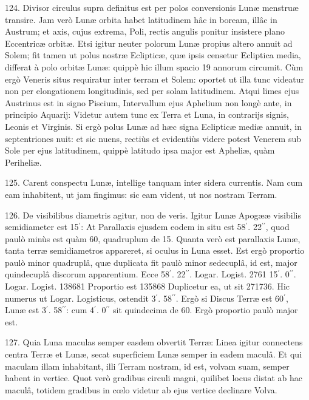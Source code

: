 \documentclass[a4paper, 11pt, oneside, polutonikogreek, german]{article}
\begin{document}
124. Divisor circulus supra definitus est per polos conversionis Lunæ menstruæ transire. Jam verò Lunæ orbita habet latitudinem hâc in boream, illâc in Austrum; et axis, cujus extrema, Poli, rectis angulis ponitur insistere plano Eccentricæ orbitæ. Etsi igitur neuter polorum Lunæ propius altero annuit ad Solem; fit tamen ut polus nostræ Eclipticæ, quæ ipsis censetur Ecliptica media, differat à polo orbitæ Lunæ: quippè hic illum spacio 19 annorum circumit. Cùm ergò Veneris situs requiratur inter terram et Solem: oportet ut illa tunc videatur non per elongationem longitudinis, sed per solam latitudinem. Atqui limes ejus Austrinus est in signo Piscium, Intervallum ejus Aphelium non longè ante, in principio Aquarij: Videtur autem tunc ex Terra et Luna, in contrarijs signis, Leonis et Virginis. Si ergò polus Lunæ ad hæc signa Eclipticæ mediæ annuit, in septentriones nuit: et sic nuens, rectiùs et evidentiùs videre potest Venerem sub Sole per ejus latitudinem, quippè latitudo ipsa major est Apheliæ, quàm Periheliæ.

125. Carent conspectu Lunæ, intellige tanquam inter sidera currentis. Nam cum eam inhabitent, ut jam fingimus: sic eam vident, ut nos nostram Terram.

126. De visibilibus diametris agitur, non de veris. Igitur Lunæ Apogææ visibilis semidiameter est 15$^{\prime}$: At Parallaxis ejusdem eodem in situ est 58$^{\prime}$. 22$^{\prime\prime}$, quod paulò minùs est quàm 60, quadruplum de 15. Quanta verò est parallaxis Lunæ, tanta terræ semidiametros appareret, si oculus in Luna esset. Est ergò proportio paulò minor quadruplâ, quæ duplicata fit paulò minor sedecuplâ, id est, major quindecuplâ discorum apparentium. Ecce\hspace*{5mm}
58$^{\prime}$. 22$^{\prime\prime}$. Logar. Logist. 2761\hspace*{5mm}
15$^{\prime}$. 0$^{\prime\prime}$. Logar. Logist. 138681\hspace*{5mm}
Proportio est 135868\hspace*{5mm}
Duplicetur ea, ut sit 271736.\hspace*{5mm}
Hic numerus ut Logar. Logisticus, ostendit 3$^{\prime}$. 58$^{\prime\prime}$. Ergò si Discus Terræ est 60$^{\prime}$, Lunæ est 3$^{\prime}$. 58$^{\prime\prime}$: cum 4$^{\prime}$. 0$^{\prime\prime}$ sit quindecima de 60. Ergò proportio paulò major est.

127. Quia Luna maculas semper easdem obvertit Terræ: Linea igitur connectens centra Terræ et Lunæ, secat superficiem Lunæ semper in eadem maculâ. Et qui maculam illam inhabitant, illi Terram nostram, id est, volvam suam, semper habent in vertice. Quot verò gradibus circuli magni, quilibet locus distat ab hac maculâ, totidem gradibus in cœlo videtur ab ejus vertice declinare Volva.
\end{document}
